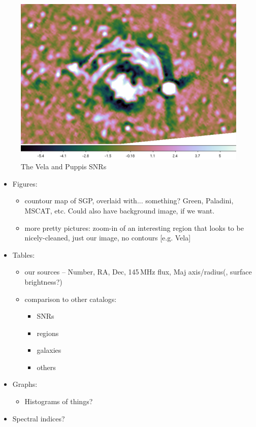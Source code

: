 \documentclass[preprint2,epsf,epsfig,graphics]{emulateapj}
\begin{document}
\begin{figure}
\includegraphics[width=\columnwidth]{vela_cubehelix.png}
\caption{The Vela and Puppis SNRs}
\end{figure}

\begin{itemize}
\item Figures:
\begin{itemize}
	\item countour map of SGP, overlaid with... something? Green, Paladini, MSCAT, etc. Could also have background image, if we want.
	\item more pretty pictures: zoom-in of an interesting region that looks to be nicely-cleaned, just our image, no contours [e.g. Vela]
\end{itemize}
\item Tables: 
	\begin{itemize}
	\item our sources -- Number, RA, Dec, 145\,MHz flux, Maj axis/radius(, surface brightness?)
	\item comparison to other catalogs:
		\begin{itemize}
		\item SNRs
		\item {} regions
		\item galaxies
		\item others
		\end{itemize}
	\end{itemize}	
\item Graphs:
	\begin{itemize}
	\item Histograms of things?
	\end{itemize}
\item Spectral indices?
\end{itemize}
\end{document}
